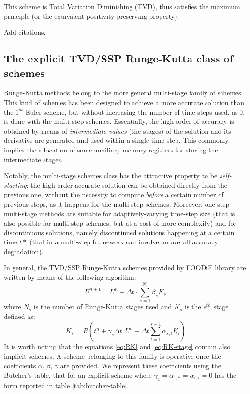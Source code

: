 \documentclass[pdftex,preprint,3p,times,numbers]{elsarticle}
\begin{document}
This scheme is Total Variation Diminishing (TVD), thus satisfies the maximum principle (or the equivalent positivity preserving property).

{\color{red} Add citations.}

\subsection{The explicit TVD/SSP Runge-Kutta class of schemes}

Runge-Kutta methods belong to the more general multi-stage family of schemes. This kind of schemes has been designed to achieve a more accurate solution than the $1^{st}$ Euler scheme, but without increasing the number of time steps used, as it is done with the multi-step schemes. Essentially, the high order of accuracy is obtained by means of \emph{intermediate values} (the stages) of the solution and its derivative are generated and used within a single time step. This commonly implies the allocation of some auxiliary memory registers for storing the intermediate stages.

Notably, the multi-stage schemes class has the attractive property to be \emph{self-starting}: the high order accurate solution can be obtained directly from the previous one, without the necessity to compute \emph{before} a certain number of previous steps, as it happens for the multi-step schemes. Moreover, one-step multi-stage methods are suitable for adaptively-varying time-step size (that is also possible for multi-step schemes, but at a cost of more complexity) and for discontinuous solutions, namely discontinued solutions happening at a certain time $t*$ (that in a multi-step framework can involve an overall accuracy degradation).

In general, the TVD/SSP Runge-Kutta schemes provided by FOODiE library are written by means of the following algorithm:
\begin{equation}
  U^{n+1} = U^{n} + \Delta t \cdot\sum\limits_{s=1}^{N_{s}}{\beta_s K_s}
\label{eq:RK}
\end{equation}
where $N_s$ is the number of Runge-Kutta stages used and $K_s$ is the $s^{th}$ stage defined as:
\begin{equation}
  K_s = R\left(t^n + \gamma_s \Delta t, U^n+\Delta t\sum\limits_{l=1}^{s-1}{\alpha_{s,l} K_l} \right)
\label{eq:RK-stage}
\end{equation}
It is worth noting that the equations \ref{eq:RK} and \ref{eq:RK-stage} contain also implicit schemes. A scheme belonging to this family is operative once the coefficients $\alpha,\, \beta,\, \gamma$ are provided. We represent these coefficients using the Butcher's table, that for an explicit scheme where $\gamma_1=\alpha_{1,*}=\alpha_{i,i}=0$ has the form reported in table \ref{tab:butcher-table}.
\end{document}
